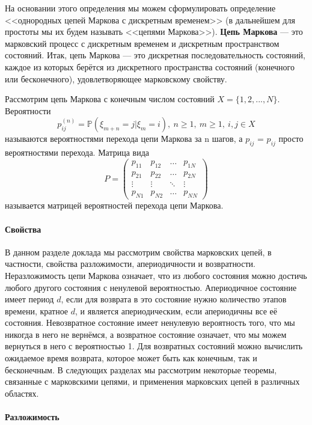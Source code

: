 На основании этого определения мы можем сформулировать определение <<однородных цепей Маркова с дискретным временем>> (в дальнейшем для простоты мы их будем называть <<цепями Маркова>>). \textbf{Цепь Маркова} — это марковский процесс с дискретным временем и дискретным пространством состояний. Итак, цепь Маркова — это дискретная последовательность состояний, каждое из которых берётся из дискретного пространства состояний (конечного или бесконечного), удовлетворяющее марковскому свойству.

Рассмотрим цепь Маркова с конечным числом состояний $X = \{1, 2, ..., N\}$. Вероятности
\[
p_{ij}^{(n)} = \mathbb{P} (\xi_{m + n} = j | \xi_m = i), \  n \geq 1, \  m \geq 1, \  i, j \in X
\]
называются вероятностями перехода цепи Маркова за n шагов, а $p_{ij}$ = $p_{ij}$ просто вероятностями перехода. Матрица вида
\[
P = \begin{pmatrix}
p_{11} & p_{12} & \dots & p_{1N}\\
p_{21} & p_{22} & \dots & p_{2N}\\
\vdots & \vdots & \ddots & \vdots\\
p_{N1} & p_{N2} & \dots & p_{NN}
\end{pmatrix}
\]
называется матрицей вероятностей перехода цепи Маркова.

\paragraph{Свойства}

В данном разделе доклада мы рассмотрим свойства марковских цепей, в частности, свойства разложимости, апериодичности и возвратности. Неразложимость цепи Маркова означает, что из любого состояния можно достичь любого другого состояния с ненулевой вероятностью. Апериодичное состояние имеет период $d$, если для возврата в это состояние нужно количество этапов времени, кратное $d$, и является апериодическим, если апериодичны все её состояния. Невозвратное состояние имеет ненулевую вероятность того, что мы никогда в него не вернёмся, а возвратное состояние означает, что мы можем вернуться в него с вероятностью 1. Для возвратных состояний можно вычислить ожидаемое время возврата, которое может быть как конечным, так и бесконечным. В следующих разделах мы рассмотрим некоторые теоремы, связанные с марковскими цепями, и применения марковских цепей в различных областях.

\paragraph{Разложимость}

